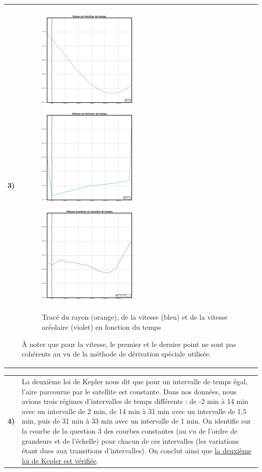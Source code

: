 \documentclass{article}
\newcommand{\question}[2]
{
    \begin{tabularx}{\linewidth}{lX}
        \textbf{#1)} & {#2}
    \end{tabularx} 
}
\begin{document}
\question{3}{
\begin{figure}[H]
  \centering
  \includegraphics[width=50mm]{img/radius.png}
  \includegraphics[width=50mm]{img/velocity.png}
  \includegraphics[width=50mm]{img/areal_velocity.png}
  \caption{Tracé du rayon (orange), de la vitesse (bleu) et de la vitesse aréolaire (violet) en fonction du temps}
\end{figure}
À noter que pour la vitesse, le premier et le dernier point ne sont pas cohérents au vu de la méthode de dérivation spéciale utilisée.
}

\question{4}{
  La deuxième loi de Kepler nous dit que pour un intervalle de temps égal, l'aire parcourue par le satellite est constante. Dans nos données, nous avions trois régimes d'intervalles de temps différents : de -2 min à 14 min avec un intervalle de 2 min, de 14 min à 31 min avec un intervalle de 1,5 min, puis de 31 min à 33 min avec un intervalle de 1 min. On identifie sur la courbe de la question 3 des courbes constantes (au vu de l'ordre de grandeurs et de l'échelle) pour chacun de ces intervalles (les variations étant dues aux transitions d'intervalles). On conclut ainsi que \underline{la deuxième loi de Kepler est vérifiée}.
}
\end{document}
